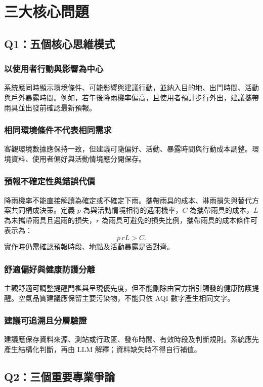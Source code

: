 \documentclass[conference]{IEEEtran}
\begin{document}
\section{三大核心問題}

\subsection{Q1：五個核心思維模式}
\subsubsection{以使用者行動與影響為中心}
系統應同時顯示環境條件、可能影響與建議行動，並納入目的地、出門時間、活動與戶外暴露時間。例如，若午後降雨機率偏高，且使用者預計步行外出，建議攜帶雨具並出發前確認最新預報。

\subsubsection{相同環境條件不代表相同需求}
客觀環境數據應保持一致，但建議可隨偏好、活動、暴露時間與行動成本調整。環境資料、使用者偏好與活動情境應分開保存。

\subsubsection{預報不確定性與錯誤代價}
降雨機率不能直接解讀為確定或不確定下雨。攜帶雨具的成本、淋雨損失與替代方案共同構成決策。定義 $p$ 為與活動情境相符的遇雨機率，$C$ 為攜帶雨具的成本，$L$ 為未攜帶雨具且遇雨的損失，$r$ 為雨具可避免的損失比例，攜帶雨具的成本條件可表示為：
\begin{equation}
p\,rL > C.
\end{equation}
實作時仍需確認預報時段、地點及活動暴露是否對齊。

\subsubsection{舒適偏好與健康防護分離}
主觀舒適可調整提醒門檻與呈現優先度，但不能刪除由官方指引觸發的健康防護提醒。空氣品質建議應保留主要污染物，不能只依 AQI 數字產生相同文字。

\subsubsection{建議可追溯且分層驗證}
建議應保存資料來源、測站或行政區、發布時間、有效時段及判斷規則。系統應先產生結構化判斷，再由 LLM 解釋；資料缺失時不得自行補值。

\subsection{Q2：三個重要專業爭論}
\end{document}
